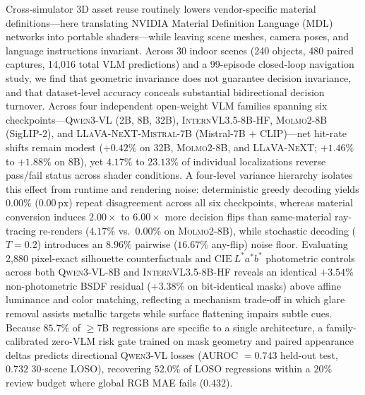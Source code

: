 Cross-simulator 3D asset reuse routinely lowers vendor-specific material definitions---here translating NVIDIA Material Definition Language (\textsc{MDL}) networks into portable \usdps{} shaders---while leaving scene meshes, camera poses, and language instructions invariant. Across 30 indoor scenes (240 objects, 480 paired captures, 14,016 total \textsc{VLM} predictions) and a 99-episode closed-loop navigation study, we find that geometric invariance does not guarantee decision invariance, and that dataset-level accuracy conceals substantial bidirectional decision turnover. Across four independent open-weight \textsc{VLM} families spanning six checkpoints---\textsc{Qwen3-VL} (2B, 8B, 32B), \textsc{InternVL3.5-8B-HF}, \textsc{Molmo2-8B} (SigLIP-2), and \textsc{LLaVA-NeXT-Mistral-7B} (Mistral-7B + CLIP)---net hit-rate shifts remain modest ($+0.42\%$ on 32B, \textsc{Molmo2-8B}, and \textsc{LLaVA-NeXT}; $+1.46\%$ to $+1.88\%$ on 8B), yet $4.17\%$ to $23.13\%$ of individual localizations reverse pass/fail status across shader conditions. A four-level variance hierarchy isolates this effect from runtime and rendering noise: deterministic greedy decoding yields $0.00\%$ ($0.00\,\mathrm{px}$) repeat disagreement across all six checkpoints, whereas material conversion induces $2.00\times$ to $6.00\times$ more decision flips than same-material ray-tracing re-renders ($4.17\%$ vs.\ $0.00\%$ on \textsc{Molmo2-8B}), while stochastic decoding ($T{=}0.2$) introduces an $8.96\%$ pairwise ($16.67\%$ any-flip) noise floor. Evaluating 2,880 pixel-exact silhouette counterfactuals and $\mathrm{CIE}~L^*a^*b^*$ photometric controls across both \textsc{Qwen3-VL-8B} and \textsc{InternVL3.5-8B-HF} reveals an identical $+3.54\%$ non-photometric \textsc{BSDF} residual ($+3.38\%$ on bit-identical masks) above affine luminance and color matching, reflecting a mechanism trade-off in which glare removal assists metallic targets while surface flattening impairs subtle cues. Because $85.7\%$ of $\ge$7B regressions are specific to a single architecture, a family-calibrated zero-\textsc{VLM} risk gate trained on mask geometry and paired appearance deltas predicts directional \textsc{Qwen3-VL} losses (\textsc{AUROC} $= 0.743$ held-out test, $0.732$ 30-scene \textsc{LOSO}), recovering $52.0\%$ of \textsc{LOSO} regressions within a $20\%$ review budget where global \textsc{RGB MAE} fails ($0.432$).
